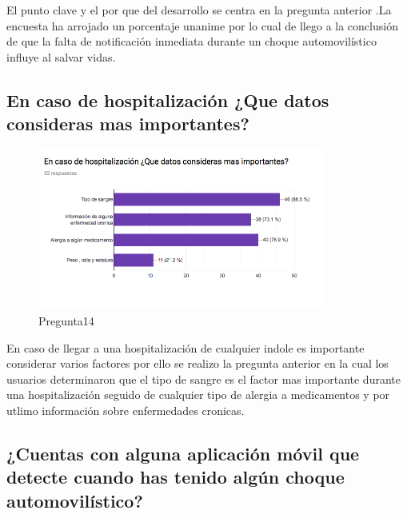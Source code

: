 El punto clave y el por que del desarrollo se centra en la pregunta anterior .La encuesta ha arrojado un porcentaje unanime por lo cual de llego a la conclusión de que la falta de notificación inmediata durante un choque automovilístico influye al salvar vidas.\\

\subsection{En caso de hospitalización ¿Que datos consideras mas importantes?}

\begin{figure}[htbp!]
	\begin{center}
		\includegraphics[width=0.85\textwidth]{DisenoEstructura/imagenes/Pregunta14}
		\caption{Pregunta14}
		\label{DE/FO/Pregunta14}
	\end{center}
\end{figure}

En caso de llegar a una hospitalización de cualquier indole es importante considerar varios factores por ello se realizo la pregunta anterior en la cual los usuarios determinaron que el tipo de sangre es el factor mas importante durante una hospitalización seguido de cualquier tipo de alergia a medicamentos y por utlimo información sobre enfermedades cronicas. \\

\subsection{¿Cuentas con alguna aplicación móvil que detecte cuando has tenido algún choque automovilístico?}

